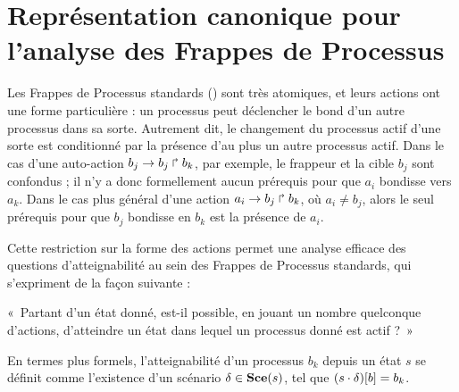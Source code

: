 
\chapter{Représentation canonique pour l'analyse des Frappes de Processus}



Les Frappes de Processus standards () sont très atomiques,
et leurs actions ont une forme particulière :
un processus peut déclencher le bond d'un autre processus dans sa sorte.
Autrement dit, le changement du processus actif d'une sorte est conditionné par la présence
d'au plus un autre processus actif.
Dans le cas d'une auto-action $b_j\rightarrow b_j\Rsh b_k$, par exemple,
le frappeur et la cible $b_j$ sont confondus ;
il n'y a donc formellement aucun prérequis pour que $a_i$ bondisse vers $a_k$.
Dans le cas plus général d'une action $a_i\rightarrow b_j\Rsh b_k$, où $a_i \neq b_j$,
alors le seul prérequis pour que $b_j$ bondisse en $b_k$ est la présence de $a_i$.

Cette restriction sur la forme des actions permet une analyse efficace des questions d'atteignabilité
au sein des Frappes de Processus standards, qui s'expriment de la façon suivante :
\begin{center}
  «~Partant d'un état donné, est-il possible, en jouant un nombre quelconque d'actions,
  d'atteindre un état dans lequel un processus donné est actif ?~»
\end{center}
En termes plus formels, l'atteignabilité d'un processus $b_k$ depuis un état $s$
se définit comme l'existence d'un scénario $\delta \in \mathbf{Sce}(s)$, tel que
${(s \cdot \delta)[b]} = b_k$.

